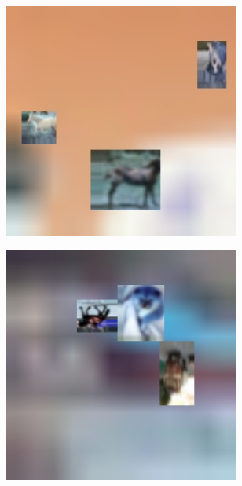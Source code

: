 \begin{figure}[H]
	\begin{center}
	\begin{subfigure}{.3\textwidth}
		\includegraphics[width=0.85\textwidth]{img/cifar-zsd-test400.jpg}
		\label{fig:ex1}
	\end{subfigure}
	\begin{subfigure}{.3\textwidth}
		\includegraphics[width=0.85\textwidth]{img/cifar-zsd-test379.jpg}
		\label{fig:ex2}
	\end{subfigure}

\end{center}
\end{figure}
